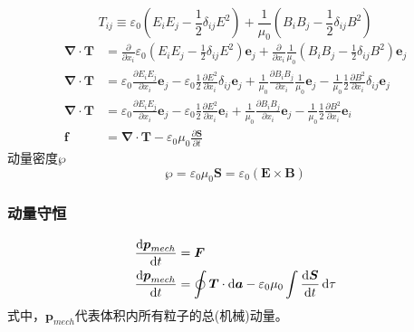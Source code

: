 \begin{equation}
    T_{ij}\equiv\varepsilon_0\left(E_iE_j-\frac{1}{2}\delta_{ij}E^2\right)+\frac{1}{\mu_0}\left(B_iB_j-\frac{1}{2}\delta_{ij}B^2\right)
\end{equation}
\begin{align}
    \boldsymbol{\nabla}\cdot\boldsymbol{T}&=\frac{\partial}{\partial x_i}\varepsilon_0\left(E_iE_j-\frac{1}{2}\delta_{ij}E^2\right)\boldsymbol{e}_j
    +\frac{\partial}{\partial x_i}\frac{1}{\mu_0}\left(B_iB_j-\frac{1}{2}\delta_{ij}B^2\right)\boldsymbol{e}_j\nonumber\\
    \boldsymbol{\nabla}\cdot\boldsymbol{T}&=\varepsilon_0\frac{\partial E_iE_j}{\partial x_i}\boldsymbol{e}_j
    -\varepsilon_0\frac{1}{2}\frac{\partial E^2}{\partial x_i}\delta_{ij}\boldsymbol{e}_j
    +\frac{1}{\mu_0}\frac{\partial B_iB_j}{\partial x_i}\frac{1}{\mu_0}\boldsymbol{e}_j
    -\frac{1}{\mu_0}\frac{1}{2}\frac{\partial B^2}{\partial x_i}\delta_{ij}\boldsymbol{e}_j\nonumber\\
    \boldsymbol{\nabla}\cdot\boldsymbol{T}&=\varepsilon_0\frac{\partial E_iE_j}{\partial x_i}\boldsymbol{e}_j
    -\varepsilon_0\frac{1}{2}\frac{\partial E^2}{\partial x_i}\boldsymbol{e}_i
    +\frac{1}{\mu_0}\frac{\partial B_iB_j}{\partial x_i}\boldsymbol{e}_j
    -\frac{1}{\mu_0}\frac{1}{2}\frac{\partial B^2}{\partial x_i}\boldsymbol{e}_i\nonumber\\
    \boldsymbol{f}&=\boldsymbol{\nabla}\cdot\boldsymbol{T}-\varepsilon_0\mu_0\frac{\partial\boldsymbol S}{\partial t}\label{麦克斯韦应力张量受力}
\end{align}
动量密度$\boldsymbol{\wp}$
\begin{equation}
    \boldsymbol{\wp}=\varepsilon_0\mu_0\boldsymbol{S}=\varepsilon_0(\boldsymbol{E}\times\boldsymbol{B})
\end{equation}
\subsubsection{动量守恒}
\begin{align}
    \frac{\dif \boldsymbol{p}_{mech}}{\dif t}&=\boldsymbol{F}\\
    \frac{\dif \boldsymbol{p}_{mech}}{\dif t}&=\oint\boldsymbol{T}\cdot\dif\boldsymbol{a}-\varepsilon_0\mu_0\int\frac{\dif\boldsymbol S}{\dif t}\dif\tau
\end{align}
式中，$\boldsymbol{p}_{mech}$代表体积内所有粒子的总(机械)动量。
